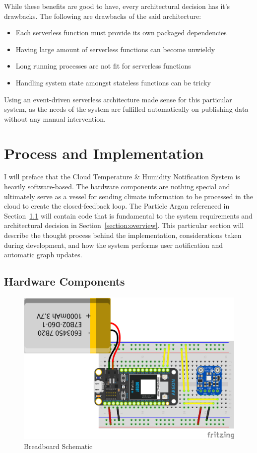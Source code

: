 \documentclass{article}
\begin{document}
While these benefits are good to have, every architectural decision has it's drawbacks. The following  are drawbacks of the said architecture:

\begin{itemize}
	\item Each serverless function must provide its own packaged dependencies
	\item Having large amount of serverless functions can become unwieldy
	\item Long running processes are not fit for serverless functions
	\item Handling system state amongst stateless functions can be tricky
\end{itemize}

Using an event-driven serverless architecture made sense for this particular system, as the needs of the system are fulfilled automatically on publishing data without any manual intervention.

\section{Process and Implementation}
I will preface that the Cloud Temperature \& Humidity Notification System is heavily software-based. The hardware components are nothing special and ultimately serve as a vessel for sending climate information to be processed in the cloud to create the closed-feedback loop. The Particle Argon referenced in Section~\ref{section:hardware} will contain code that is fundamental to the system requirements and architectural decision in Section~\ref{section:overview}. This particular section will describe the thought process behind the implementation, considerations taken during development, and how the system performs user notification and automatic graph updates.

\subsection{Hardware Components}
\label{section:hardware}
\begin{figure}[H]
	\center
	\includegraphics[width=\textwidth]{images/breadboard-schematic.png}
	\caption{Breadboard Schematic}
	\label{fig:breadboard_schematic}
\end{figure}
\end{document}
